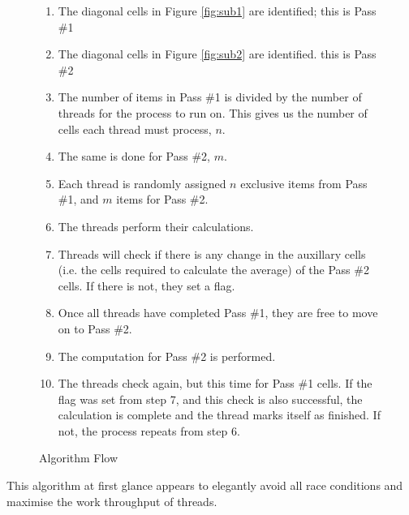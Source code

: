 \documentclass{article}
\begin{document}
\begin{figure}[H]
    \begin{enumerate}
        \item The diagonal cells in Figure \ref{fig:sub1} are identified; this is Pass \#1
        \item The diagonal cells in Figure \ref{fig:sub2} are identified. this is Pass \#2
        \item The number of items in Pass \#1 is divided by the number of threads for the process to run on. This gives us the number of cells each thread must process, $n$.
        \item The same is done for Pass \#2, $m$.
        \item Each thread is randomly assigned $n$ exclusive items from Pass \#1, and $m$ items for Pass \#2.
        \item The threads perform their calculations.
        \item Threads will check if there is any change in the auxillary cells (i.e. the cells required to calculate the average) of the Pass \#2 cells. If there is not, they set a flag.
        \item Once all threads have completed Pass \#1, they are free to move on to Pass \#2.
        \item The computation for Pass \#2 is performed.
        \item The threads check again, but this time for Pass \#1 cells. If the flag was set from step 7, and this check is also successful, the calculation is complete and the thread marks itself as finished. If not, the process repeats from step 6.
    \end{enumerate}
    \caption{Algorithm Flow}
    \label{algo}
\end{figure}
This algorithm at first glance appears to elegantly avoid all race conditions and maximise the work throughput of threads. \newpage
\end{document}

